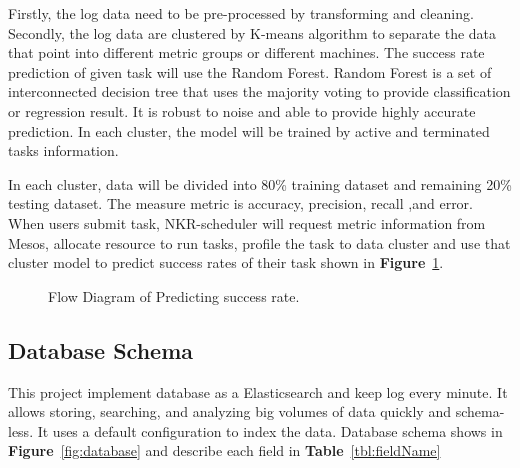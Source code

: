 \documentclass[12pt,oneside,openright,a4paper]{cpe-english-project}
\begin{document}
\begin{enumerate}
\hspace{10mm}Firstly, the log data need to be pre-processed by transforming and cleaning.  Secondly, the log data are clustered by K-means algorithm to separate the data that point into different metric groups or different machines.  The success rate prediction of given task will use the Random Forest. Random Forest is a set of interconnected decision tree that uses the majority voting to provide classification or regression result. It is robust to noise and able to provide highly accurate prediction. \cite{adaptiveScheduling} In each cluster, the model will be trained by active and terminated tasks information. 

\hspace{10mm}In each cluster, data will be divided into 80\% training dataset and remaining 20\% testing dataset. The measure metric is accuracy, precision, recall ,and error. When users submit task, NKR-scheduler will request metric information from Mesos, allocate resource to run tasks, profile the task to data cluster and use that cluster model to predict success rates of their task shown in \textbf{Figure}~\ref{fig:flowDiagramPredict}.

  \begin{figure}[!h]\centering
    \setlength{\fboxrule}{0mm} %
    \setlength{\fboxsep}{0cm}
    \caption{Flow Diagram of Predicting success rate.}\label{fig:flowDiagramPredict}
  \end{figure}

\end{enumerate}

\newpage
\subsection{Database Schema}  

\hspace{10mm}This project implement database as a Elasticsearch and keep log every minute. It allows storing, searching, and analyzing big volumes of data quickly and schema-less. It uses a default configuration to index the data. Database schema shows in \textbf{Figure}~\ref{fig:database} and describe each field in \textbf{Table}~\ref{tbl:fieldName}
\end{document}
